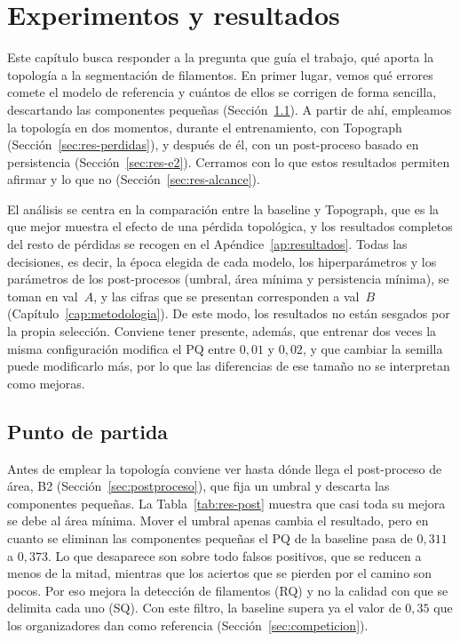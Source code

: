 
\chapter{Experimentos y resultados}
\label{cap:resultados}

Este capítulo busca responder a la pregunta que guía el trabajo, qué
aporta la topología a la segmentación de filamentos. En primer lugar,
vemos qué errores comete el modelo de referencia y cuántos de ellos se
corrigen de forma sencilla, descartando las componentes pequeñas
(Sección~\ref{sec:res-post}). A partir de ahí, empleamos la topología en
dos momentos, durante el entrenamiento, con Topograph
(Sección~\ref{sec:res-perdidas}), y después de él, con un post-proceso
basado en persistencia (Sección~\ref{sec:res-e2}). Cerramos con lo que
estos resultados permiten afirmar y lo que no
(Sección~\ref{sec:res-alcance}).

El análisis se centra en la comparación entre la baseline y Topograph,
que es la que mejor muestra el efecto de una pérdida topológica, y los
resultados completos del resto de pérdidas se recogen en el
Apéndice~\ref{ap:resultados}. Todas las decisiones, es decir, la época
elegida de cada modelo, los hiperparámetros y los parámetros de los
post-procesos (umbral, área mínima y persistencia mínima), se toman en
val~$A$, y las cifras que se presentan corresponden a val~$B$
(Capítulo~\ref{cap:metodologia}). De este modo, los resultados no están
sesgados por la propia selección. Conviene tener presente, además, que
entrenar dos veces la misma configuración modifica el PQ entre $0{,}01$
y $0{,}02$, y que cambiar la semilla puede modificarlo más, por lo que
las diferencias de ese tamaño no se interpretan como mejoras.

\section{Punto de partida}
\label{sec:res-post}

Antes de emplear la topología conviene ver hasta dónde llega el
post-proceso de área, B2 (Sección~\ref{sec:postproceso}), que fija un
umbral y descarta las componentes pequeñas. La Tabla~\ref{tab:res-post}
muestra que casi toda su mejora se debe al área mínima. Mover el umbral
apenas cambia el resultado, pero en cuanto se eliminan las componentes
pequeñas el PQ de la baseline pasa de $0{,}311$ a $0{,}373$. Lo que
desaparece son sobre todo falsos positivos, que se reducen a menos de la
mitad, mientras que los aciertos que se pierden por el camino son pocos.
Por eso mejora la detección de filamentos (RQ) y no la calidad con que
se delimita cada uno (SQ). Con este filtro, la baseline supera ya el
valor de $0{,}35$ que los organizadores dan como referencia
(Sección~\ref{sec:competicion}).

